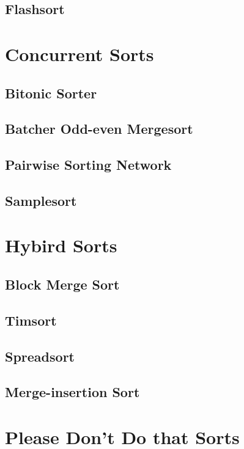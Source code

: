 			\subsection{Flashsort}

		\section{Concurrent Sorts}
			\subsection{Bitonic Sorter}

			\subsection{Batcher Odd-even Mergesort}

			\subsection{Pairwise Sorting Network}

			\subsection{Samplesort}

		\section{Hybird Sorts}
			\subsection{Block Merge Sort}

			\subsection{Timsort}

			\subsection{Spreadsort}

			\subsection{Merge-insertion Sort}

		\section{Please Don't Do that Sorts}
